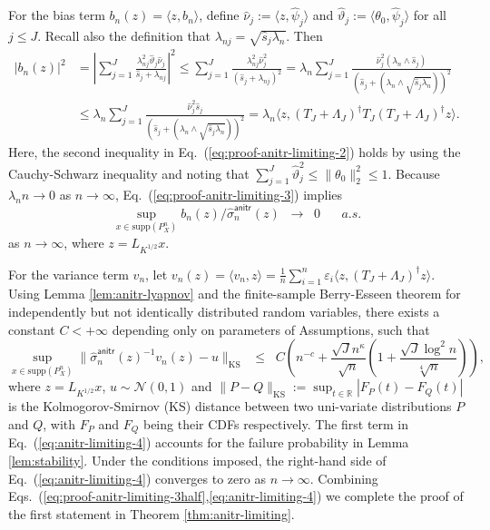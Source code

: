 \documentclass[11pt,a4paper]{article}
\newcommand{\ks}{\mathrm{KS}}
\renewcommand{\hat}{\widehat}
\theoremstyle{definition}
\theoremstyle{plain}
\theoremstyle{remark}
\newcommand{\supp}{\mathrm{supp}}
\newcommand{\anitr}{\mathsf{anitr}}
\begin{document}
For the bias term $b_n(z)=\langle z,b_n\rangle$, define $\hat\nu_j := \langle z,\hat\psi_j\rangle$ and $\hat\vartheta_j := \langle \theta_0,\hat\psi_j\rangle$ for all $j\leq J$. 
Recall also the definition that $\lambda_{nj} = \sqrt{\hat s_j\lambda_n}$. Then
\begin{align}
\big|b_n(z)\big|^2 &= \left|\sum_{j=1}^J\frac{\lambda_{nj}^2\hat\vartheta_j\hat\nu_j}{\hat s_j+\lambda_{nj}}\right|^2 \leq \sum_{j=1}^J\frac{\lambda_{nj}^2\hat\nu_j^2}{(\hat s_j+\lambda_{nj})^2}
=\lambda_n\sum_{j=1}^J\frac{\hat\nu_j^2(\lambda_n\wedge\hat s_j)}{(\hat s_j+(\lambda_n\wedge\sqrt{\hat s_j\lambda_n}))^2}\label{eq:proof-anitr-limiting-2}\\
&\leq \lambda_n\sum_{j=1}^J\frac{\hat\nu_j^2\hat s_j}{(\hat s_j+(\lambda_n\wedge\sqrt{\hat s_j\lambda_n}))^2} = \lambda_n\langle z, (T_J+\Lambda_J)^\dagger T_J(T_J+\Lambda_J)^\dagger z\rangle.\label{eq:proof-anitr-limiting-3}
\end{align}
Here, the second inequality in Eq.~(\ref{eq:proof-anitr-limiting-2}) holds by using the Cauchy-Schwarz inequality and noting that $\sum_{j=1}^J\hat\vartheta_j^2\leq \|\theta_0\|_2^2\leq 1$.
Because $\lambda_n n\to0$ as $n\to\infty$, Eq.~(\ref{eq:proof-anitr-limiting-3}) implies
\begin{equation}
\sup_{x\in \supp(P_X^n)}b_n(z)/\hat\sigma_n^\anitr(z)\;\;\to\;\;0\;\;\;\;\;\;a.s.
\label{eq:proof-anitr-limiting-3half}
\end{equation}
as $n\to\infty$, where $z=L_{K^{1/2}}x$.

For the variance term $v_n$, let $v_n(z)= \langle v_n,z\rangle = \frac{1}{n}\sum_{i=1}^n\varepsilon_i \langle z, (T_J+\Lambda_J)^\dagger z\rangle$.
Using Lemma \ref{lem:anitr-lyapnov} and the finite-sample Berry-Esseen theorem for independently but not identically distributed random variables, there exists a constant $C<+\infty$
depending only on parameters of Assumptions, such that
\begin{equation}
\sup_{x\in\supp(P_X^n)} \|\hat\sigma_n^\anitr(z)^{-1}v_n(z) - u\|_{\ks} \;\;\leq\;\; C\left(n^{-c} + \frac{\sqrt{J}n^{\kappa}}{\sqrt{n}} \left(1+\frac{\sqrt{J}\log^2 n}{\sqrt[4]{n}}\right)\right),
\label{eq:anitr-limiting-4}
\end{equation}
where $z=L_{K^{1/2}}x$, $u\sim\mathcal N(0,1)$ and $\|P-Q\|_\ks := \sup_{t\in\mathbb R}|F_P(t)-F_Q(t)|$ is the Kolmogorov-Smirnov (KS) distance between two uni-variate distributions $P$ and $Q$,
with $F_P$ and $F_Q$ being their CDFs respectively.
The first term in Eq.~(\ref{eq:anitr-limiting-4}) accounts for the failure probability in Lemma \ref{lem:stability}.
Under the conditions imposed, the right-hand side of Eq.~(\ref{eq:anitr-limiting-4}) converges to zero as $n\to\infty$.
Combining Eqs.~(\ref{eq:proof-anitr-limiting-3half},\ref{eq:anitr-limiting-4}) we complete the proof of the first statement in Theorem \ref{thm:anitr-limiting}.
\end{document}
